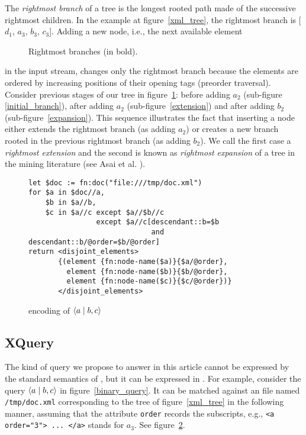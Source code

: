 The \emph{rightmost branch} of a tree is the longest rooted path made
 of the successive rightmost children. In the example at
 figure~\ref{xml_tree}, the rightmost branch is [\(d_1\), \(a_3\),
 \(b_3\), \(c_3\)]. Adding a new node, i.e., the next available
 element
\begin{wrapfigure}[11]{r}{0pt}
\centering
{}
\quad
{}
\quad
{}
\caption{Rightmost branches (in bold).\label{rightmost_branches}}
\end{wrapfigure}
in the input stream, changes only the rightmost branch because the
elements are ordered by increasing positions of their opening tags
(preorder traversal). Consider previous stages of our \XML tree in
figure~\ref{rightmost_branches}: before adding \(a_2\)
(sub\hyp{}figure \ref{initial_branch}), after adding \(a_2\)
(sub\hyp{}figure~\ref{extension}) and after adding \(b_2\)
(sub\hyp{}figure~\ref{expansion}). This sequence illustrates the fact
that inserting a node either extends the rightmost branch (as adding
\(a_2\)) or creates a new branch rooted in the previous rightmost
branch (as adding \(b_2\)). We call the first case a \emph{rightmost
  extension} and the second is known as \emph{rightmost expansion} of
a tree in the mining literature (see Asai et al. \cite{Asai:2003}).
\begin{figure}
{\footnotesize
\begin{verbatim}
let $doc := fn:doc("file:///tmp/doc.xml")
for $a in $doc//a,
    $b in $a//b,
    $c in $a//c except $a//$b//c
                except $a//c[descendant::b=$b
                             and descendant::b/@order=$b/@order]
return <disjoint_elements>
       {(element {fn:node-name($a)}{$a/@order},
         element {fn:node-name($b)}{$b/@order},
         element {fn:node-name($c)}{$c/@order})}
       </disjoint_elements>
\end{verbatim}
}
\caption{\XQuery encoding of \(\langle a \mid b, c\rangle\)}
\label{problem:xquery}
\end{figure}


\subsection{XQuery}

The kind of query we propose to answer in this article cannot be
 expressed by the standard semantics of \XPath, but it can be
 expressed in \XQuery. For example, consider the query \(\langle a \mid b,
 c\rangle\) in figure~\ref{binary_query}. It can be matched against an \XML
 file named \texttt{\small /tmp/doc.xml} corresponding to the \XML
 tree of figure~\ref{xml_tree} in the following manner, assuming that
 the attribute \texttt{\small order} records the subscripts, e.g.,
 \texttt{\small <a order="3"> ... </a>} stands for \(a_3\). See
figure~\ref{problem:xquery}.

